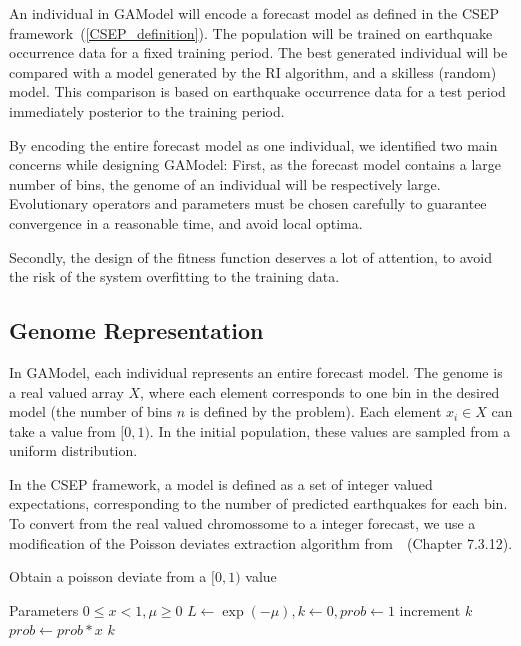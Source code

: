 \documentclass{sig-alternate}
\begin{document}
An individual in GAModel will encode a forecast model as defined in
the CSEP framework~(\ref{CSEP_definition}). The population will be
trained on earthquake occurrence data for a fixed training period. The
best generated individual will be compared with a model generated by
the RI algorithm, and a skilless (random) model. This comparison is
based on earthquake occurrence data for a test period immediately
posterior to the training period.

By encoding the entire forecast model as one individual, we identified
two main concerns while designing GAModel: First, as the forecast
model contains a large number of bins, the genome of an individual
will be respectively large. Evolutionary operators and parameters must
be chosen carefully to guarantee convergence in a reasonable time, and
avoid local optima.

Secondly, the design of the fitness function deserves a lot of
attention, to avoid the risk of the system overfitting to the training
data.

\subsection{Genome Representation} %


In GAModel, each individual represents an entire forecast model. The
genome is a real valued array $X$, where each element corresponds to
one bin in the desired model (the number of bins $n$ is defined by the
problem). Each element $x_i \in X$ can take a value from $[0,1)$. In
  the initial population, these values are sampled from a uniform
  distribution.

In the CSEP framework, a model is defined as a set of integer valued
expectations, corresponding to the number of predicted earthquakes for
each bin. To convert from the real valued chromossome to a integer
forecast, we use a modification of the Poisson deviates extraction
algorithm from~\cite{NumericalRecipes}~(Chapter 7.3.12).

\begin{algorithm}
  \caption{Obtain a poisson deviate from a $[0,1)$ value}
  \label{InversePoisson}
  \begin{algorithmic}
    \STATE Parameters $0 \leq x < 1, \mu \geq 0$
    \STATE $L \gets \exp{(-\mu)}, k \gets 0, prob \gets 1$
    \REPEAT 
    \STATE $\text{increment }k$
    \STATE $prob \gets prob*x$
    \RETURN $k$
  \end{algorithmic}
\end{algorithm}
\end{document}
